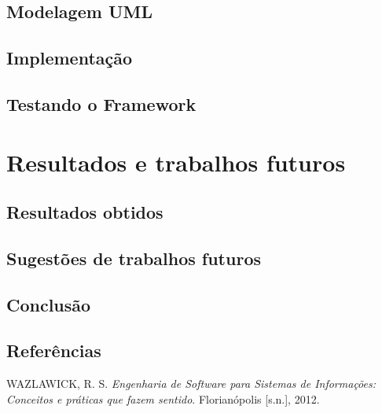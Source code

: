 \documentclass[
    12pt,       %
    openright,      %
    twoside,      %
    a4paper,      %
    english,      %
    french,       %
    spanish,      %
    brazil,       %
    ]{abntex2}
\begin{document}
  \chapter{Modelagem UML}

  \chapter{Implementação}

  \chapter{Testando o Framework}

  \part{Resultados e trabalhos futuros}

  \chapter{Resultados obtidos}

  \chapter{Sugestões de trabalhos futuros}

  \chapter{Conclusão}





  \lipsum[31-33]

  \postextual


  
  \chapter*{Referências}
  \noindent
  WAZLAWICK, R. S. \textit{Engenharia de Software para Sistemas de Informações: Conceitos e práticas que fazem sentido}. Florianópolis [s.n.], 2012.
\end{document}
